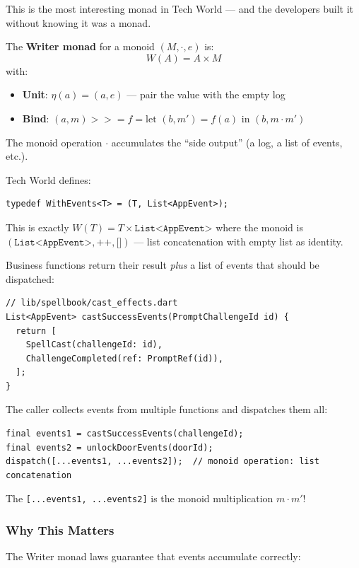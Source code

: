 \documentclass[12pt,a4paper]{article}
\theoremstyle{definition}
\theoremstyle{plain}
\theoremstyle{remark}
\begin{document}
This is the most interesting monad in Tech World --- and the developers
built it without knowing it was a monad.

\begin{formal}
The \textbf{Writer monad} for a monoid $(M, \cdot, e)$ is:
\[
W(A) = A \times M
\]
with:
\begin{itemize}
  \item \textbf{Unit}: $\eta(a) = (a, e)$ --- pair the value with the empty log
  \item \textbf{Bind}: $(a, m) \mathbin{>\!\!>\!\!=} f = \text{let } (b, m') = f(a) \text{ in } (b, m \cdot m')$
\end{itemize}
The monoid operation $\cdot$ accumulates the ``side output'' (a log, a list of
events, etc.).
\end{formal}

\begin{youknow}
Tech World defines:
\begin{lstlisting}
typedef WithEvents<T> = (T, List<AppEvent>);
\end{lstlisting}
This is exactly $W(T) = T \times \texttt{List<AppEvent>}$ where
the monoid is $(\texttt{List<AppEvent>}, \texttt{++}, \texttt{[]})$
--- list concatenation with empty list as identity.

Business functions return their result \emph{plus} a list of events
that should be dispatched:
\begin{lstlisting}
// lib/spellbook/cast_effects.dart
List<AppEvent> castSuccessEvents(PromptChallengeId id) {
  return [
    SpellCast(challengeId: id),
    ChallengeCompleted(ref: PromptRef(id)),
  ];
}
\end{lstlisting}

The caller collects events from multiple functions and dispatches them all:
\begin{lstlisting}
final events1 = castSuccessEvents(challengeId);
final events2 = unlockDoorEvents(doorId);
dispatch([...events1, ...events2]);  // monoid operation: list concatenation
\end{lstlisting}
The \texttt{[...events1, ...events2]} is the monoid multiplication $m \cdot m'$!
\end{youknow}

\subsubsection*{Why This Matters}

The Writer monad laws guarantee that events accumulate correctly:
\end{document}

